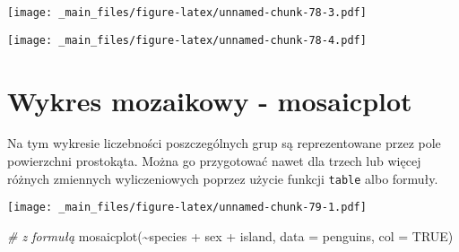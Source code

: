\documentclass[
]{book}
\newenvironment{Shaded}{\begin{snugshade}}{\end{snugshade}}
\newcommand{\AttributeTok}[1]{\textcolor[rgb]{0.77,0.63,0.00}{#1}}
\newcommand{\CommentTok}[1]{\textcolor[rgb]{0.56,0.35,0.01}{\textit{#1}}}
\newcommand{\ConstantTok}[1]{\textcolor[rgb]{0.00,0.00,0.00}{#1}}
\newcommand{\FunctionTok}[1]{\textcolor[rgb]{0.00,0.00,0.00}{#1}}
\newcommand{\NormalTok}[1]{#1}
\newcommand{\SpecialCharTok}[1]{\textcolor[rgb]{0.00,0.00,0.00}{#1}}
\newcommand{\StringTok}[1]{\textcolor[rgb]{0.31,0.60,0.02}{#1}}
\begin{document}
\texttt{[image: \_main\_files/figure-latex/unnamed-chunk-78-3.pdf]}

\begin{Shaded}
\end{Shaded}

\texttt{[image: \_main\_files/figure-latex/unnamed-chunk-78-4.pdf]}

\hypertarget{wykres-mozaikowy---mosaicplot}{%
\section{Wykres mozaikowy - mosaicplot}\label{wykres-mozaikowy---mosaicplot}}

Na tym wykresie liczebności poszczególnych grup są reprezentowane przez pole powierzchni prostokąta. Można go przygotować nawet dla trzech lub więcej różnych zmiennych wyliczeniowych poprzez użycie funkcji \texttt{table} albo formuły.

\begin{Shaded}
\end{Shaded}

\texttt{[image: \_main\_files/figure-latex/unnamed-chunk-79-1.pdf]}

\begin{Shaded}
\begin{Highlighting}[]
\CommentTok{\# z formułą}
\FunctionTok{mosaicplot}\NormalTok{(}\SpecialCharTok{\textasciitilde{}}\NormalTok{species }\SpecialCharTok{+}\NormalTok{ sex }\SpecialCharTok{+}\NormalTok{ island, }\AttributeTok{data =}\NormalTok{ penguins, }\AttributeTok{col =} \ConstantTok{TRUE}\NormalTok{)}
\end{Highlighting}
\end{Shaded}
\end{document}
